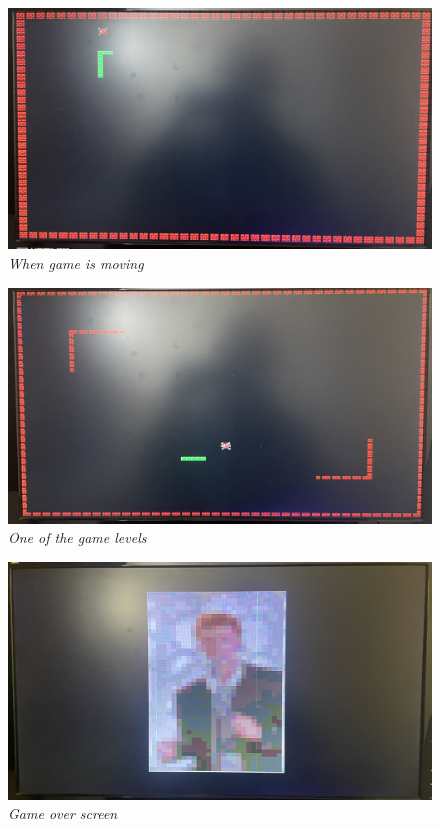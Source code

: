 \documentclass[aps, secnumarabic, balancelastpage, asmath, amssymb, nofootinbib, floatfix,]{revtex4-2}
\begin{document}
{\begin{figure}[h]
  \centering
  \includegraphics[scale = 0.5]{moving.jpg}
  \caption{\em When game is moving}
  \label{fig:18}
\end{figure}

\clearpage

\begin{figure}[h]
  \centering
  \includegraphics[scale = 0.5]{level.jpg}
  \caption{\em One of the game levels}
  \label{fig:19}
\end{figure}

\begin{figure}[h]
  \centering
  \includegraphics[scale = 0.5]{over.jpg}
  \caption{\em Game over screen}
  \label{fig:20}
\end{figure}

}
\end{document}
